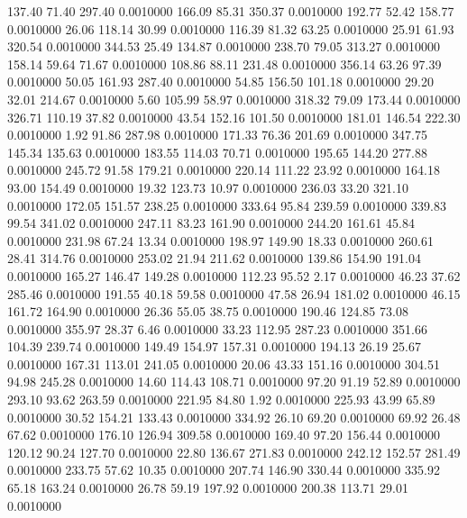  137.40   71.40  297.40   0.0010000
 166.09   85.31  350.37   0.0010000
 192.77   52.42  158.77   0.0010000
  26.06  118.14   30.99   0.0010000
 116.39   81.32   63.25   0.0010000
  25.91   61.93  320.54   0.0010000
 344.53   25.49  134.87   0.0010000
 238.70   79.05  313.27   0.0010000
 158.14   59.64   71.67   0.0010000
 108.86   88.11  231.48   0.0010000
 356.14   63.26   97.39   0.0010000
  50.05  161.93  287.40   0.0010000
  54.85  156.50  101.18   0.0010000
  29.20   32.01  214.67   0.0010000
   5.60  105.99   58.97   0.0010000
 318.32   79.09  173.44   0.0010000
 326.71  110.19   37.82   0.0010000
  43.54  152.16  101.50   0.0010000
 181.01  146.54  222.30   0.0010000
   1.92   91.86  287.98   0.0010000
 171.33   76.36  201.69   0.0010000
 347.75  145.34  135.63   0.0010000
 183.55  114.03   70.71   0.0010000
 195.65  144.20  277.88   0.0010000
 245.72   91.58  179.21   0.0010000
 220.14  111.22   23.92   0.0010000
 164.18   93.00  154.49   0.0010000
  19.32  123.73   10.97   0.0010000
 236.03   33.20  321.10   0.0010000
 172.05  151.57  238.25   0.0010000
 333.64   95.84  239.59   0.0010000
 339.83   99.54  341.02   0.0010000
 247.11   83.23  161.90   0.0010000
 244.20  161.61   45.84   0.0010000
 231.98   67.24   13.34   0.0010000
 198.97  149.90   18.33   0.0010000
 260.61   28.41  314.76   0.0010000
 253.02   21.94  211.62   0.0010000
 139.86  154.90  191.04   0.0010000
 165.27  146.47  149.28   0.0010000
 112.23   95.52    2.17   0.0010000
  46.23   37.62  285.46   0.0010000
 191.55   40.18   59.58   0.0010000
  47.58   26.94  181.02   0.0010000
  46.15  161.72  164.90   0.0010000
  26.36   55.05   38.75   0.0010000
 190.46  124.85   73.08   0.0010000
 355.97   28.37    6.46   0.0010000
  33.23  112.95  287.23   0.0010000
 351.66  104.39  239.74   0.0010000
 149.49  154.97  157.31   0.0010000
 194.13   26.19   25.67   0.0010000
 167.31  113.01  241.05   0.0010000
  20.06   43.33  151.16   0.0010000
 304.51   94.98  245.28   0.0010000
  14.60  114.43  108.71   0.0010000
  97.20   91.19   52.89   0.0010000
 293.10   93.62  263.59   0.0010000
 221.95   84.80    1.92   0.0010000
 225.93   43.99   65.89   0.0010000
  30.52  154.21  133.43   0.0010000
 334.92   26.10   69.20   0.0010000
  69.92   26.48   67.62   0.0010000
 176.10  126.94  309.58   0.0010000
 169.40   97.20  156.44   0.0010000
 120.12   90.24  127.70   0.0010000
  22.80  136.67  271.83   0.0010000
 242.12  152.57  281.49   0.0010000
 233.75   57.62   10.35   0.0010000
 207.74  146.90  330.44   0.0010000
 335.92   65.18  163.24   0.0010000
  26.78   59.19  197.92   0.0010000
 200.38  113.71   29.01   0.0010000

